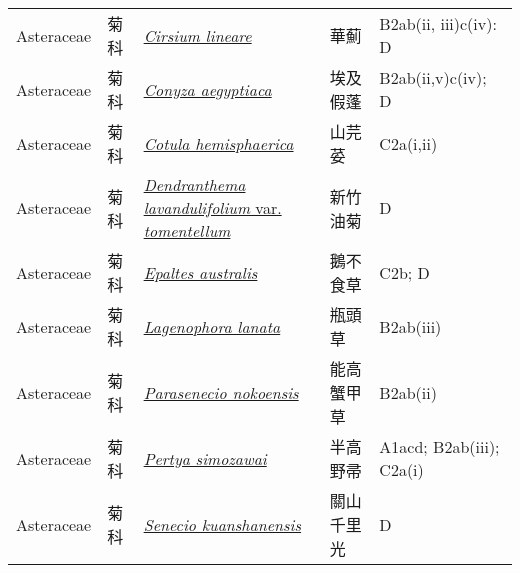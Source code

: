 {\begin{longtable}{L{2.5cm}L{2cm}L{5cm}L{2.5cm}L{3cm}}
    Asteraceae & 菊科 & \href{http://www.theplantlist.org/tpl1.1/search?q=Cirsium+lineare}{\textit{Cirsium lineare} } & 華薊 & B2ab(ii, iii)c(iv): D    \\
    Asteraceae & 菊科 & \href{http://www.theplantlist.org/tpl1.1/search?q=Conyza+aegyptiaca}{\textit{Conyza aegyptiaca} } & 埃及假蓬 & B2ab(ii,v)c(iv); D    \\
    Asteraceae & 菊科 & \href{http://www.theplantlist.org/tpl1.1/search?q=Cotula+hemisphaerica}{\textit{Cotula hemisphaerica} } & 山芫荽 & C2a(i,ii)    \\
    Asteraceae & 菊科 & \href{http://www.theplantlist.org/tpl1.1/search?q=Dendranthema+lavandulifolium+var.+tomentellum}{\textit{Dendranthema lavandulifolium} var. \textit{tomentellum} } & 新竹油菊 & D    \\
    Asteraceae & 菊科 & \href{http://www.theplantlist.org/tpl1.1/search?q=Epaltes+australis}{\textit{Epaltes australis} } & 鵝不食草 & C2b; D    \\
    Asteraceae & 菊科 & \href{http://www.theplantlist.org/tpl1.1/search?q=Lagenophora+lanata}{\textit{Lagenophora lanata} } & 瓶頭草 & B2ab(iii)    \\
    Asteraceae & 菊科 & \href{http://www.theplantlist.org/tpl1.1/search?q=Parasenecio+nokoensis}{\textit{Parasenecio nokoensis} } & 能高蟹甲草 & B2ab(ii)    \\
    Asteraceae & 菊科 & \href{http://www.theplantlist.org/tpl1.1/search?q=Pertya+simozawai}{\textit{Pertya simozawai} } & 半高野帚 & A1acd; B2ab(iii); C2a(i)    \\
    Asteraceae & 菊科 & \href{http://www.theplantlist.org/tpl1.1/search?q=Senecio+kuanshanensis}{\textit{Senecio kuanshanensis} } & 關山千里光 & D    \\

\end{longtable}}
